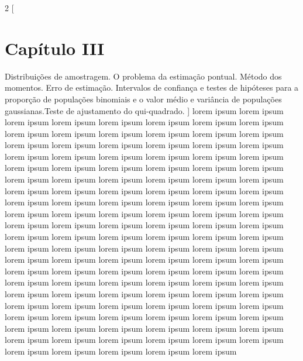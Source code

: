 \begin{multicols}{2}
    [
        \section{Capítulo III}
        Distribuições de amostragem. O problema da estimação pontual. Método dos momentos. Erro de estimação. Intervalos de confiança e testes de hipóteses para a proporção de populações binomiais e o valor médio e variância de populações gaussianas.Teste de ajustamento do qui-quadrado.
    ]
    lorem ipsum lorem ipsum lorem ipsum lorem ipsum lorem ipsum lorem ipsum lorem ipsum lorem ipsum lorem ipsum lorem ipsum lorem ipsum lorem ipsum lorem ipsum lorem ipsum lorem ipsum lorem ipsum lorem ipsum lorem ipsum lorem ipsum lorem ipsum lorem ipsum lorem ipsum lorem ipsum lorem ipsum lorem ipsum lorem ipsum lorem ipsum lorem ipsum lorem ipsum lorem ipsum lorem ipsum lorem ipsum lorem ipsum lorem ipsum lorem ipsum lorem ipsum lorem ipsum lorem ipsum lorem ipsum lorem ipsum lorem ipsum lorem ipsum lorem ipsum lorem ipsum lorem ipsum lorem ipsum lorem ipsum lorem ipsum lorem ipsum lorem ipsum lorem ipsum lorem ipsum lorem ipsum lorem ipsum lorem ipsum lorem ipsum lorem ipsum lorem ipsum lorem ipsum lorem ipsum lorem ipsum lorem ipsum lorem ipsum lorem ipsum lorem ipsum lorem ipsum lorem ipsum lorem ipsum lorem ipsum lorem ipsum lorem ipsum lorem ipsum lorem ipsum lorem ipsum lorem ipsum lorem ipsum lorem ipsum lorem ipsum lorem ipsum lorem ipsum lorem ipsum lorem ipsum lorem ipsum lorem ipsum lorem ipsum lorem ipsum lorem ipsum lorem ipsum lorem ipsum lorem ipsum lorem ipsum lorem ipsum lorem ipsum lorem ipsum lorem ipsum lorem ipsum lorem ipsum lorem ipsum lorem ipsum lorem ipsum lorem ipsum lorem ipsum lorem ipsum lorem ipsum lorem ipsum lorem ipsum lorem ipsum lorem ipsum lorem ipsum lorem ipsum lorem ipsum lorem ipsum lorem ipsum lorem ipsum lorem ipsum lorem ipsum lorem ipsum lorem ipsum lorem ipsum lorem ipsum lorem ipsum lorem ipsum lorem ipsum lorem ipsum lorem ipsum lorem ipsum lorem ipsum 
    \end{multicols}